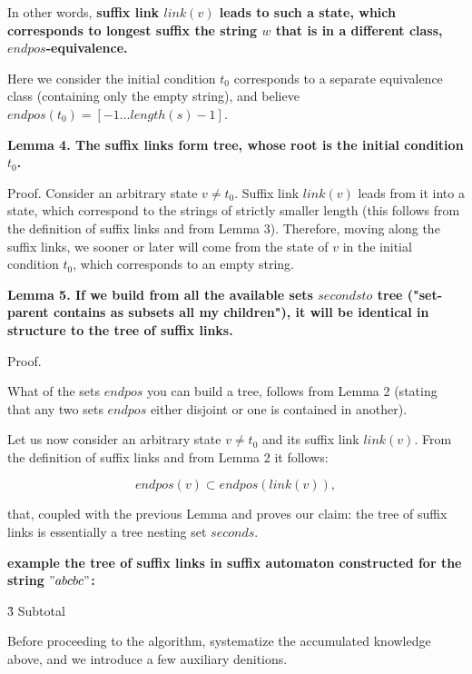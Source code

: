 In other words, \bf{suffix link} $link(v)$ leads to such a state, which corresponds to \bf{longest suffix} the string $w$ that is in a different class, $endpos$-equivalence.

Here we consider the initial condition $t_0$ corresponds to a separate equivalence class (containing only the empty string), and believe $endpos(t_0) = [-1 \ldots length(s)-1]$.

\bf{Lemma 4}. The suffix links form \bf{tree}, whose root is the initial condition $t_0$.

Proof. Consider an arbitrary state $v \ne t_0$. Suffix link $link(v)$ leads from it into a state, which correspond to the strings of strictly smaller length (this follows from the definition of suffix links and from Lemma 3). Therefore, moving along the suffix links, we sooner or later will come from the state of $v$ in the initial condition $t_0$, which corresponds to an empty string.

\bf{Lemma 5}. If we build from all the available sets $seconds to$ \bf{tree} ("set-parent contains as subsets all my children"), it will be identical in structure to the tree of suffix links.

Proof.

What of the sets $endpos$ you can build a tree, follows from Lemma 2 (stating that any two sets $endpos$ either disjoint or one is contained in another).

Let us now consider an arbitrary state $v \ne t_0$ and its suffix link $link(v)$. From the definition of suffix links and from Lemma 2 it follows:

$$ endpos(v) \subset endpos(link(v)), $$

that, coupled with the previous Lemma and proves our claim: the tree of suffix links is essentially a tree nesting set $seconds$.

\bf{example} the tree of suffix links in suffix automaton constructed for the string $"abcbc"$:



\h3{ Subtotal }

Before proceeding to the algorithm, systematize the accumulated knowledge above, and we introduce a few auxiliary denitions.

